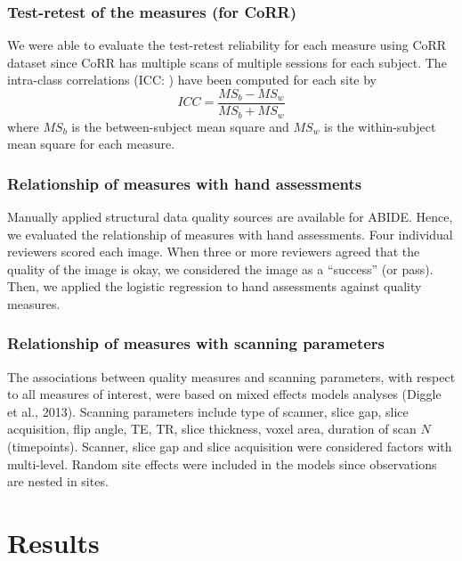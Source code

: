 \documentclass{frontiersSCNS} %
\begin{document}
\subsubsection{Test-retest of the measures (for CoRR)}
\label{sec:26}
We were able to evaluate the test-retest reliability for each measure using CoRR dataset since CoRR has multiple scans of multiple sessions for each subject. The intra-class correlations (ICC: \cite{Shrout79}) have been computed for each site by
\begin{equation}
ICC = \frac{MS_b - MS_w} {MS_b + MS_w}
\end{equation}
where $MS_b$ is the between-subject mean square and $MS_w$ is the within-subject mean square for each measure.


\subsubsection{Relationship of measures with hand assessments}
\label{sec:27}
Manually applied structural data quality sources are available for ABIDE. Hence, we evaluated the relationship of measures with hand assessments. Four individual reviewers scored each image. When three or more reviewers agreed that the quality of the image is okay, we considered the image as a ``success'' (or pass). Then, we applied the logistic regression to hand assessments against quality measures.

\subsubsection{Relationship of measures with scanning parameters}
The associations between quality measures and scanning parameters, with respect to all measures of interest, were based on mixed effects models analyses (Diggle et al., 2013). Scanning parameters include type of scanner, slice gap, slice acquisition, flip angle, TE, TR, slice thickness, voxel area, duration of scan $N$ (timepoints). Scanner, slice gap and slice acquisition were considered factors with multi-level. Random site effects were included in the models since observations are nested in sites.

\section{Results}
\label{sec:28}
\end{document}
